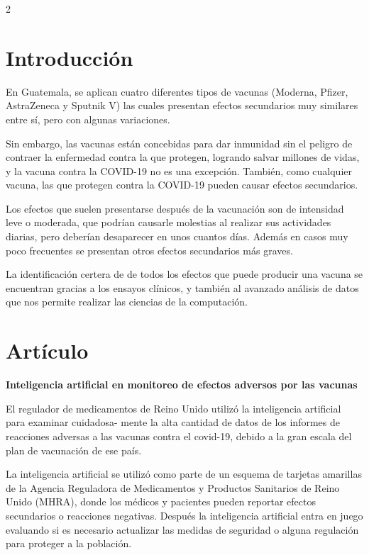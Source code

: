 \documentclass[12pt,spanish,Letterpaper,openany]{book}
\begin{document}
\begin {multicols}{2}

\hypertarget{introducciuxf3n-7}{%
\section{Introducción}\label{introducciuxf3n-7}}

En Guatemala, se aplican cuatro diferentes tipos de vacunas (Moderna, Pfizer, AstraZeneca y
Sputnik V) las cuales presentan efectos secundarios muy similares entre sí, pero con algunas
variaciones.

Sin embargo, las vacunas están concebidas para dar inmunidad sin el peligro de contraer la
enfermedad contra la que protegen, logrando salvar millones de vidas, y la vacuna contra la
COVID-19 no es una excepción.
También, como cualquier vacuna, las que protegen contra la COVID-19 pueden causar
efectos secundarios.

Los efectos que suelen presentarse después de la vacunación son de intensidad leve o
moderada, que podrían causarle molestias al realizar sus actividades diarias, pero deberían
desaparecer en unos cuantos días. Además en casos muy poco frecuentes se presentan otros
efectos secundarios más graves.

La identificación certera de de todos los efectos que puede producir una vacuna se encuentran
gracias a los ensayos clínicos, y también al avanzado análisis de datos que nos permite
realizar las ciencias de la computación.

\hypertarget{artuxedculo-11}{%
\section{Artículo}\label{artuxedculo-11}}

\textbf{Inteligencia artificial en monitoreo de efectos adversos por las vacunas}

El regulador de medicamentos de Reino Unido utilizó la inteligencia artificial para examinar
cuidadosa-
mente la alta cantidad de datos de los informes de reacciones adversas a las vacunas
contra el covid-19, debido a la gran escala del plan de vacunación de ese país.

La inteligencia artificial se utilizó como parte de un esquema de tarjetas amarillas de la
Agencia Reguladora de Medicamentos y Productos Sanitarios de Reino Unido (MHRA),
donde los médicos y pacientes pueden reportar efectos secundarios o reacciones negativas.
Después la inteligencia artificial entra en juego evaluando si es necesario actualizar las
medidas de seguridad o alguna regulación para proteger a la población.


\end{multicols}
\end{document}
